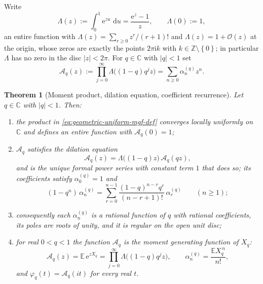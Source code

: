 \documentclass[11pt,oneside,openany]{book}
\newtheorem{theorem}{Theorem}[chapter]
\theoremstyle{definition}
\theoremstyle{remark}
\newcommand{\C}{\mathbb C}
\newcommand{\Z}{\mathbb Z}
\newcommand{\OO}{\mathcal O}
\newcommand{\e}{\mathrm e}
\newcommand{\dd}{\,\mathrm d}
\newcommand{\abs}[1]{\lvert #1\rvert}
\newcommand{\set}[1]{\left\{#1\right\}}
\newcommand{\defeq}{\mathrel{:=}}
\begin{document}
Write
\begin{equation}\label{eq:uniform-mgf-kernel}
 \Lambda(z)\defeq\int_0^1\e^{zu}\,\dd u=\frac{\e^z-1}{z},
 \qquad\Lambda(0)\defeq1,
\end{equation}
an entire function with $\Lambda(z)=\sum_{r\ge0}z^r/(r+1)!$ and $\Lambda(z)=1+\OO(z)$ at the
origin, whose zeros are exactly the points $2\pi\mathrm ik$ with $k\in\Z\setminus\set{0}$; in
particular $\Lambda$ has no zero in the disc $\abs z<2\pi$.  For $q\in\C$ with $\abs q<1$ set
\begin{equation}\label{eq:geometric-uniform-mgf-def}
 \mathcal A_q(z)\defeq\prod_{j=0}^{\infty}\Lambda\bigl((1-q)q^jz\bigr)
 =\sum_{n\ge0}\alpha^{(q)}_nz^n .
\end{equation}

\begin{theorem}[Moment product, dilation equation, coefficient recurrence]
\label{thm:geometric-uniform-mgf}
Let $q\in\C$ with $\abs q<1$.  Then:
\begin{enumerate}
\item the product in \eqref{eq:geometric-uniform-mgf-def} converges locally uniformly on $\C$
and defines an entire function with $\mathcal A_q(0)=1$;
\item $\mathcal A_q$ satisfies the dilation equation
\begin{equation}\label{eq:mgf-refinement}
 \mathcal A_q(z)=\Lambda\bigl((1-q)z\bigr)\,\mathcal A_q(qz),
\end{equation}
and is the unique formal power series with constant term $1$ that does so; its coefficients
satisfy $\alpha^{(q)}_0=1$ and
\begin{equation}\label{eq:q-moment-recurrence}
 (1-q^n)\,\alpha^{(q)}_n
 =\sum_{r=0}^{n-1}\frac{(1-q)^{n-r}q^r}{(n-r+1)!}\,\alpha^{(q)}_r
 \qquad(n\ge1);
\end{equation}
\item consequently each $\alpha^{(q)}_n$ is a rational function of $q$ with rational
coefficients, its poles are roots of unity, and it is regular on the open unit disc;
\item for real $0<q<1$ the function $\mathcal A_q$ is the moment generating function of
$X_q$:
\begin{equation}\label{eq:mgf-product}
 \mathcal A_q(z)=\mathbb E\,\e^{zX_q}
 =\prod_{j=0}^{\infty}\Lambda\bigl((1-q)q^jz\bigr),
 \qquad
 \alpha^{(q)}_n=\frac{\mathbb EX_q^{\,n}}{n!},
\end{equation}
and $\varphi_q(t)=\mathcal A_q(it)$ for every real $t$.
\end{enumerate}
\end{theorem}
\end{document}
